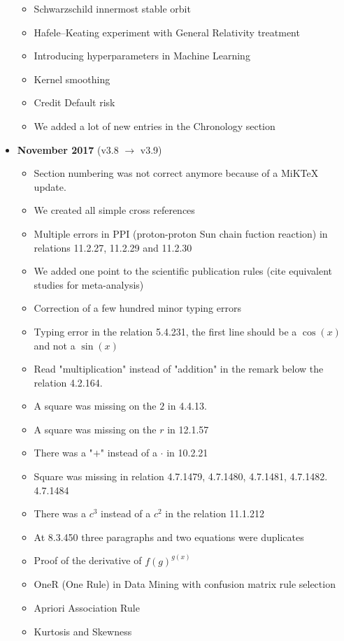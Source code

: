 \documentclass[12pt,a4paper,twoside,openright]{report}
\theoremstyle{definition}
\theoremstyle{itexmp}
\numberwithin{equation}{section}
\begin{document}
\begin{itemize}
\begin{itemize}[noitemsep]
				\item Schwarzschild innermost stable orbit
				\item Hafele–Keating experiment with General Relativity treatment
				\item Introducing hyperparameters in Machine Learning
				\item Kernel smoothing
				\item Credit Default risk
				\item We added a lot of new entries in the Chronology section
			\end{itemize}
		\item \textbf{November 2017} (v3.8 $\rightarrow$ v3.9)
			\begin{itemize}[noitemsep]
				\item Section numbering was not correct anymore because of a MiKTeX update.
				\item We created all simple cross references
				\item Multiple errors in PPI (proton-proton Sun chain fuction reaction) in relations 11.2.27, 11.2.29 and 11.2.30
				\item We added one point to the scientific publication rules (cite equivalent studies for meta-analysis)
				\item Correction of a few hundred minor typing errors
				\item Typing error in the relation 5.4.231, the first line should be a $\cos(x)$ and not a $\sin(x)$
				\item Read "multiplication" instead of "addition" in the remark below the relation 4.2.164.
				\item A square was missing on the $2$ in 4.4.13.
				\item A square was missing on the $r$ in 12.1.57
				\item There was a "$+$" instead of a $\cdot$ in 10.2.21
				\item Square was missing in relation 4.7.1479, 4.7.1480, 4.7.1481, 4.7.1482. 4.7.1484
				\item There was a $c^3$ instead of a $c^2$ in the relation 11.1.212
				\item At 8.3.450 three paragraphs and two equations were duplicates
				\item Proof of the derivative of $f(g)^{g(x)}$
				\item OneR (One Rule) in Data Mining with confusion matrix rule selection
				\item Apriori Association Rule
				\item Kurtosis and Skewness

\end{itemize}
\end{itemize}
\end{document}
